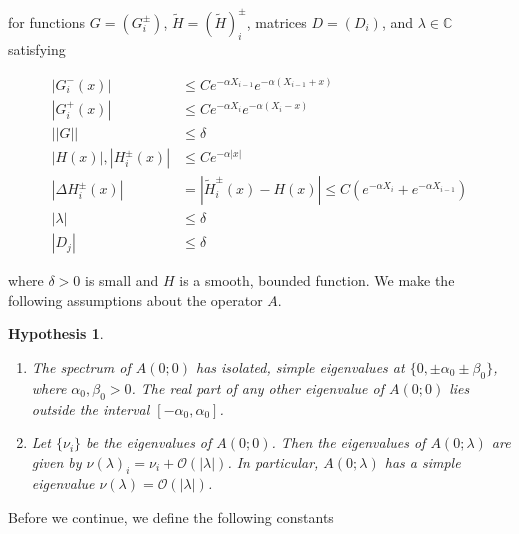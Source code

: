 \documentclass[12pt]{article}
\def\C{{\mathbb C}}
\newtheorem{hypothesis}{Hypothesis}
\begin{document}
for functions $G = (G_i^\pm)$, $\tilde{H} = (\tilde{H})_i^\pm$, matrices $D = (D_i)$, and $\lambda \in \C$ satisfying 

\begin{align}
|G_i^-(x)| &\leq C e^{-\alpha X_{i-1}} e^{-\alpha(X_{i-1} + x) } \\
|G_i^+(x)| &\leq C e^{-\alpha X_i} e^{-\alpha(X_i - x) } \\
||G|| &\leq \delta \\
|H(x)|, |H_i^\pm(x)| &\leq C e^{-\alpha |x|} \\
|\Delta H_i^\pm(x)| &= |\tilde{H}_i^\pm(x) - H(x)| \leq C( e^{-\alpha X_i} + e^{-\alpha X_{i-1}}) \\
|\lambda| &\leq \delta \\
|D_j| &\leq \delta
\end{align}

where $\delta > 0$ is small and $H$ is a smooth, bounded function. We make the following assumptions about the operator $A$.

\begin{hypothesis}\label{Aspectrumhyp}
\begin{enumerate}
	\item The spectrum of $A(0; 0)$ has isolated, simple eigenvalues at $\{ 0, \pm \alpha_0 \pm \beta_0 \}$, where $\alpha_0, \beta_0 > 0$. The real part of any other eigenvalue of $A(0; 0)$ lies outside the interval $[-\alpha_0, \alpha_0]$.
	\item Let $\{\nu_i\}$ be the eigenvalues of $A(0; 0)$. Then the eigenvalues of $A(0; \lambda)$ are given by $\nu(\lambda)_i = \nu_i + \mathcal{O}(|\lambda|)$. In particular, $A(0; \lambda)$ has a simple eigenvalue $\nu(\lambda) = \mathcal{O}(|\lambda|)$.
\end{enumerate}
\end{hypothesis}

Before we continue, we define the following constants
\end{document}
